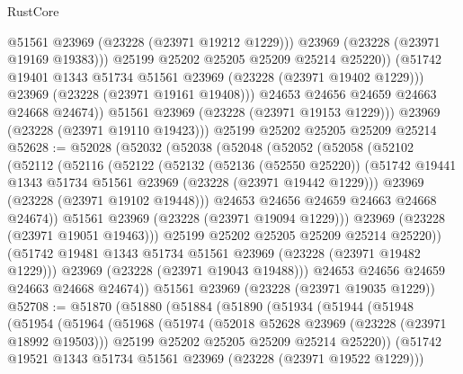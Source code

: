 \begin{lexlean}{RustCore}
\begin{coremodule}
                      @51561
                      @23969
                      (@23228 (@23971 @19212 @1229)))
                    @23969
                    (@23228 (@23971 @19169 @19383)))
                  @25199
                  @25202
                  @25205
                  @25209
                  @25214
                  @25220))
              (@51742 @19401 @1343 @51734 @51561 @23969 (@23228 (@23971 @19402 @1229)))
              @23969
              (@23228 (@23971 @19161 @19408)))
            @24653
            @24656
            @24659
            @24663
            @24668
            @24674))
        @51561
        @23969
        (@23228 (@23971 @19153 @1229)))
      @23969
      (@23228 (@23971 @19110 @19423)))
    @25199
    @25202
    @25205
    @25209
    @25214
@52628 := @52028
    (@52032
      (@52038
        (@52048
          (@52052
            (@52058
              (@52102
                (@52112
                  (@52116
                    (@52122
                      (@52132
                        (@52136 (@52550 @25220))
                        (@51742 @19441 @1343 @51734 @51561 @23969 (@23228 (@23971 @19442 @1229)))
                        @23969
                        (@23228 (@23971 @19102 @19448)))
                      @24653
                      @24656
                      @24659
                      @24663
                      @24668
                      @24674))
                  @51561
                  @23969
                  (@23228 (@23971 @19094 @1229)))
                @23969
                (@23228 (@23971 @19051 @19463)))
              @25199
              @25202
              @25205
              @25209
              @25214
              @25220))
          (@51742 @19481 @1343 @51734 @51561 @23969 (@23228 (@23971 @19482 @1229)))
          @23969
          (@23228 (@23971 @19043 @19488)))
        @24653
        @24656
        @24659
        @24663
        @24668
        @24674))
    @51561
    @23969
    (@23228 (@23971 @19035 @1229))
@52708 := @51870
    (@51880
      (@51884
        (@51890
          (@51934
            (@51944
              (@51948
                (@51954
                  (@51964
                    (@51968
                      (@51974
                        (@52018 @52628 @23969 (@23228 (@23971 @18992 @19503)))
                        @25199
                        @25202
                        @25205
                        @25209
                        @25214
                        @25220))
                    (@51742 @19521 @1343 @51734 @51561 @23969 (@23228 (@23971 @19522 @1229)))

\end{coremodule}
\end{lexlean}

